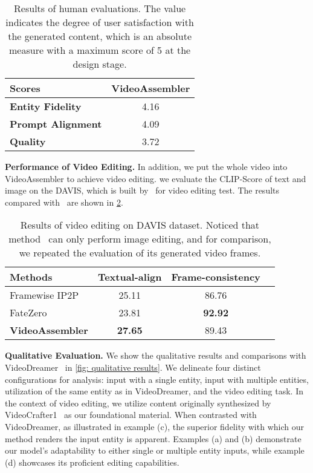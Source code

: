 \begin{table}[ht]
    \setlength{\tabcolsep}{2.0mm}
    \centering
    \begin{tabular}{lc}
       \toprule
       Scores & VideoAssembler \\
       \midrule
       \textbf{Entity Fidelity} & 4.16  \\
       \textbf{Prompt Alignment} & 4.09  \\
       \textbf{Quality} & 3.72 \\
       \bottomrule
    \end{tabular}
    \caption{Results of human evaluations. The value indicates the degree of user satisfaction with the generated content, which is an absolute measure with a maximum score of 5 at the design stage.}
    \label{tab:human_evaluation}
\end{table}

\noindent
\textbf{Performance of Video Editing.} In addition, we put the whole video into VideoAssembler to achieve video editing. we evaluate the CLIP-Score of text and image on the DAVIS, which is built by~\cite{jay2023loveu} for video editing test. The results compared with~\cite{brooks2023instructpix2pix,qi2023fatezero} are shown in \cref{tab:video editing}.

\begin{table}[ht]
    \setlength{\tabcolsep}{1.5mm}
    \centering
    \begin{tabular}{lccc}
       \toprule
       Methods & Textual-align & Frame-consistency \\
       \midrule
       Framewise IP2P~\cite{brooks2023instructpix2pix} & 25.11 & 86.76 \\
       FateZero~\cite{qi2023fatezero} & 23.81 & \textbf{92.92} \\
       \midrule
       \textbf{VideoAssembler} & \textbf{27.65} & 89.43 \\
       \bottomrule
    \end{tabular}
    \caption{Results of video editing on DAVIS dataset. Noticed that method~\cite{brooks2023instructpix2pix}  can only perform image editing, and for comparison, we repeated the evaluation of its generated video frames.}
    \label{tab:video editing}
\end{table}

\noindent
\textbf{Qualitative Evaluation.} We show the qualitative results and comparisons with VideoDreamer~\cite{chen2023videodreamer} in \cref{fig: qualitative results}. We delineate four distinct configurations for analysis: input with a single entity, input with multiple entities, utilization of the same entity as in VideoDreamer, and the video editing task. In the context of video editing, we utilize content originally synthesized by VideoCrafter1~\cite{chen2023videocrafter} as our foundational material. When contrasted with VideoDreamer, as illustrated in example (c), the superior fidelity with which our method renders the input entity is apparent. 
Examples (a) and (b) demonstrate our model's adaptability to either single or multiple entity inputs, while example (d) showcases its proficient editing capabilities.




